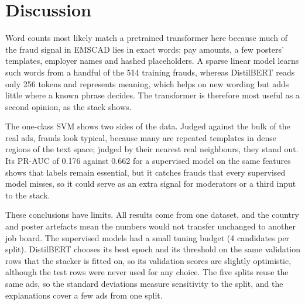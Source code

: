 \section{Discussion}
\label{discussion}

Word counts most likely match a pretrained transformer here because much of the fraud signal in
EMSCAD lies in exact words: pay amounts, a few posters' templates, employer names and
hashed placeholders. A sparse linear model learns such words from a handful of the 514 training
frauds, whereas DistilBERT reads only 256 tokens and represents meaning, which helps on new
wording but adds little where a known phrase decides. The transformer is therefore most useful as
a second opinion, as the stack shows.

The one-class SVM shows two sides of the data. Judged against the bulk of the real ads, frauds look
typical, because many are repeated templates in dense regions of the text space; judged by their
nearest real neighbours, they stand out. Its PR-AUC of 0.176 against 0.662 for a supervised model
on the same features shows that labels remain essential, but it catches frauds that every
supervised model misses, so it could serve as an extra signal for moderators or a third input to
the stack.

These conclusions have limits. All results come from one dataset, and the country and poster
artefacts mean the numbers would not transfer unchanged to another job board. The supervised
models had a small tuning budget (4 candidates per split). DistilBERT chooses its best epoch and
its threshold on the same validation rows that the stacker is fitted on, so its validation scores
are slightly optimistic, although the test rows were never used for any choice. The five splits
reuse the same ads, so the standard deviations measure sensitivity to the split, and the
explanations cover a few ads from one split.

